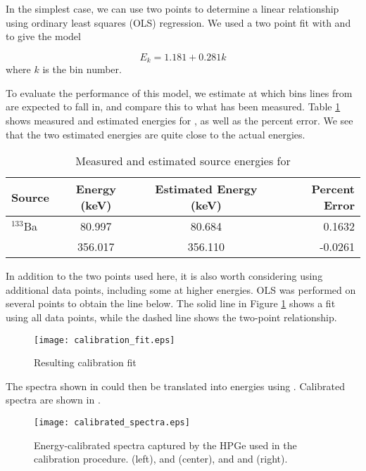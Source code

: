 In the simplest case, we can use two points to determine a linear relationship using ordinary least squares (OLS) regression.
We used a two point fit with  and  to give the model

\begin{equation}
\label{eq:cal}
E_k = 1.181 + 0.281k
\end{equation}
where $k$ is the bin number.


To evaluate the performance of this model, we estimate at which bins lines from  are expected to fall in, and compare this to what has been measured.
Table \ref{tab:barium} shows measured and estimated energies for , as well as the percent error.
We see that the two estimated energies are quite close to the actual energies.

\begin{table}
\renewcommand{\arraystretch}{1.3}
\caption{Measured and estimated source energies for }
\label{tab:barium}
\centering
\begin{tabular}{l|c|c|r}
\hline
\bfseries Source & \bfseries Energy (keV) & \bfseries Estimated Energy (keV) & \bfseries Percent Error\\
\hline\hline
      $^{133}$Ba    &  80.997    & 80.684   &  0.1632 \\
                    &  356.017   & 356.110  &  -0.0261 \\
\hline
\end{tabular}
\end{table}

In addition to the two points used here, it is also worth considering using additional data points, including some at higher energies.
OLS was performed on several points to obtain the line below.
The solid line in Figure \ref{fig:fit} shows a fit using all data points, while the dashed line shows the two-point relationship.

\begin{figure}
\centering
\texttt{[image: calibration\_fit.eps]}
\caption{Resulting calibration fit}
\label{fig:fit}
\end{figure}

The spectra shown in  could then be translated into energies using .
Calibrated spectra are shown in .
\begin{figure*}[t!]
\centering
\texttt{[image: calibrated\_spectra.eps]}
\caption{Energy-calibrated spectra captured by the HPGe used in the calibration procedure.  (left),  and  (center), and  and  (right).}
\label{fig:spectra_cal}
\end{figure*}
